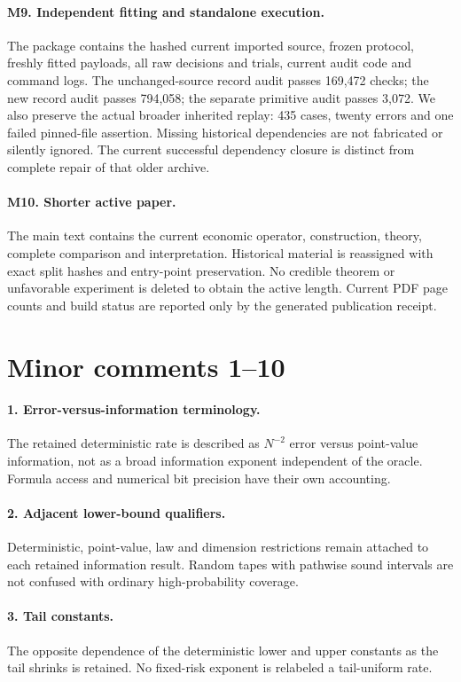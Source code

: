 \documentclass[11pt]{article}
\begin{document}
\paragraph{M9. Independent fitting and standalone execution.}
The package contains the hashed current imported source, frozen protocol, freshly fitted payloads, all raw decisions and trials, current audit code and command logs. The unchanged-source record audit passes 169,472 checks; the new record audit passes 794,058; the separate primitive audit passes 3,072. We also preserve the actual broader inherited replay: 435 cases, twenty errors and one failed pinned-file assertion. Missing historical dependencies are not fabricated or silently ignored. The current successful dependency closure is distinct from complete repair of that older archive.

\paragraph{M10. Shorter active paper.}
The main text contains the current economic operator, construction, theory, complete comparison and interpretation. Historical material is reassigned with exact split hashes and entry-point preservation. No credible theorem or unfavorable experiment is deleted to obtain the active length. Current PDF page counts and build status are reported only by the generated publication receipt.

\section*{Minor comments 1--10}
\paragraph{1. Error-versus-information terminology.}
The retained deterministic rate is described as $N^{-2}$ error versus point-value information, not as a broad information exponent independent of the oracle. Formula access and numerical bit precision have their own accounting.
\paragraph{2. Adjacent lower-bound qualifiers.}
Deterministic, point-value, law and dimension restrictions remain attached to each retained information result. Random tapes with pathwise sound intervals are not confused with ordinary high-probability coverage.
\paragraph{3. Tail constants.}
The opposite dependence of the deterministic lower and upper constants as the tail shrinks is retained. No fixed-risk exponent is relabeled a tail-uniform rate.
\end{document}
